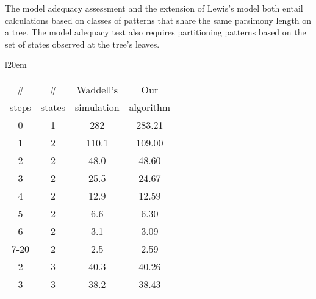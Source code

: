 \documentclass[a0paper,landscape]{baposter}
\begin{document}
\begin{poster}
{%

The model adequacy assessment \citep{WaddellOP2009} and the extension of Lewis's \citep{Lewis2001} model both entail calculations based on classes of patterns that share the same parsimony length on a tree.
The model adequacy test also requires partitioning patterns based on the set of states observed at the tree's leaves.
\begin{wrapfigure}{l}{20em}
\begin{tabular}{|cc|c|c|}
\hline
\# & \#  & Waddell's  & Our \\
 steps & states & simulation &  algorithm\\
\hline
0 & 1 & 282 & 283.21\\
1 & 2 & 110.1 & 109.00\\
2 & 2 & 48.0 & 48.60\\
3 & 2 & 25.5 & 24.67\\
4 & 2 & 12.9 & 12.59\\
5 & 2 & 6.6 & 6.30\\
6 & 2 & 3.1 & 3.09\\
7-20 & 2 & 2.5 & 2.59\\
2 & 3 & 40.3 & 40.26\\
3 & 3 & 38.2 & 38.43\\

\end{tabular}
\end{wrapfigure}}
\end{poster}
\end{document}

